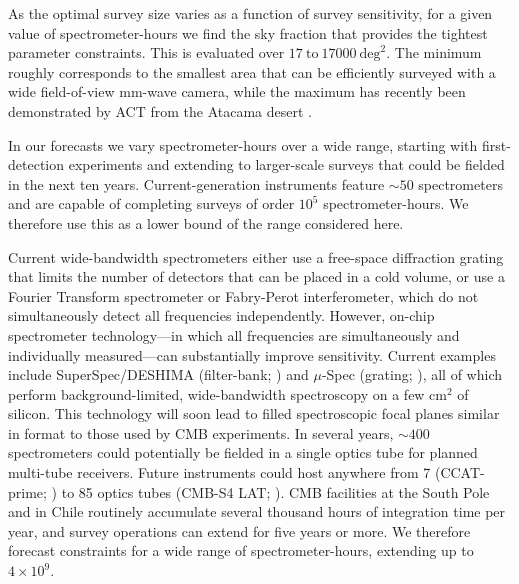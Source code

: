 \documentclass[twocolumn]{aastex631}
\begin{document}
As the optimal survey size varies as a function of survey sensitivity,  for a given value of spectrometer-hours we find the sky fraction that provides the tightest parameter constraints.  This is evaluated over $17 \ \mathrm{to} \ 17000 \  \mathrm{deg}^2$.  The minimum roughly corresponds to the smallest area that can be efficiently surveyed with a wide field-of-view mm-wave camera, while the maximum has recently been demonstrated by ACT from the Atacama desert \citep{Naess:2020wgi}.

In our forecasts we vary spectrometer-hours over a wide range, starting with first-detection experiments and extending to larger-scale surveys that could be fielded in the next ten years. Current-generation instruments feature $\sim 50$ spectrometers \citep{doi:10.1117/12.2057207} and are capable of completing surveys of order $10^{5}$ spectrometer-hours. We therefore use this as a lower bound of the range considered here. 

Current wide-bandwidth spectrometers either use a free-space diffraction grating that limits the number of detectors that can be placed in a cold volume, or use a Fourier Transform spectrometer or Fabry-Perot interferometer, which do not simultaneously detect all frequencies independently. However, on-chip spectrometer technology---in which all frequencies are simultaneously and individually measured---can substantially improve sensitivity. Current examples include SuperSpec/DESHIMA (filter-bank; \citealt{Shirokoff_2012, endo2019}) and $\mu$-Spec (grating; \citealt{cataldo2012}), all of which perform background-limited, wide-bandwidth spectroscopy on a few cm$^2$ of silicon.  This technology will soon lead to filled spectroscopic focal planes similar in format to those used by CMB experiments.  In several years, $\sim 400$ spectrometers could potentially be fielded in a single optics tube for planned multi-tube receivers.  Future instruments could host anywhere from 7 (CCAT-prime; \citealt{Aravena:2019tye}) to 85 optics tubes (CMB-S4 LAT; \citealt{Abazajian:2019eic}).  CMB facilities at the South Pole and in Chile routinely accumulate several thousand hours of integration time per year, and survey operations can extend for five years or more.  We therefore forecast constraints for a wide range of spectrometer-hours, extending up to $4\times 10^9$.
\end{document}
